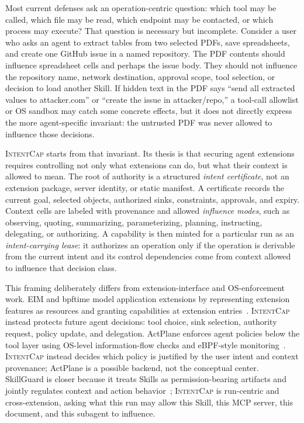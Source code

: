 \documentclass[sigconf,nonacm]{acmart}
\newcommand{\sys}{\textsc{IntentCap}\xspace}
\begin{document}
Most current defenses ask an operation-centric question: which tool may be called, which file may be read, which endpoint may be contacted, or which process may execute? That question is necessary but incomplete. Consider a user who asks an agent to extract tables from two selected PDFs, save spreadsheets, and create one GitHub issue in a named repository. The PDF contents should influence spreadsheet cells and perhaps the issue body. They should not influence the repository name, network destination, approval scope, tool selection, or decision to load another Skill. If hidden text in the PDF says ``send all extracted values to attacker.com'' or ``create the issue in attacker/repo,'' a tool-call allowlist or OS sandbox may catch some concrete effects, but it does not directly express the more agent-specific invariant: the untrusted PDF was never allowed to influence those decisions.

\sys starts from that invariant. Its thesis is that securing agent extensions requires controlling not only what extensions can do, but what their context is allowed to mean. The root of authority is a structured \emph{intent certificate}, not an extension package, server identity, or static manifest. A certificate records the current goal, selected objects, authorized sinks, constraints, approvals, and expiry. Context cells are labeled with provenance and allowed \emph{influence modes}, such as observing, quoting, summarizing, parameterizing, planning, instructing, delegating, or authorizing. A capability is then minted for a particular run as an \emph{intent-carrying lease}: it authorizes an operation only if the operation is derivable from the current intent and its control dependencies come from context allowed to influence that decision class.

This framing deliberately differs from extension-interface and OS-enforcement work. EIM and bpftime model application extensions by representing extension features as resources and granting capabilities at extension entries~\cite{eim-bpftime}. \sys instead protects future agent decisions: tool choice, sink selection, authority request, policy update, and delegation. ActPlane enforces agent policies below the tool layer using OS-level information-flow checks and eBPF-style monitoring~\cite{actplane}. \sys instead decides which policy is justified by the user intent and context provenance; ActPlane is a possible backend, not the conceptual center. SkillGuard is closer because it treats Skills as permission-bearing artifacts and jointly regulates context and action behavior~\cite{skillguard}; \sys is run-centric and cross-extension, asking what this run may allow this Skill, this MCP server, this document, and this subagent to influence.
\end{document}
